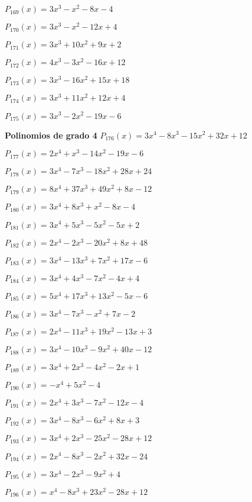 \subitem $P_{169}(x) = 3x^3 - x^2 - 8x - 4$

\subitem $P_{170}(x) = 3x^3 - x^2 - 12x + 4$

\subitem $P_{171}(x) = 3x^3 + 10x^2 + 9x + 2$

\subitem $P_{172}(x) = 4x^3 - 3x^2 - 16x + 12$

\subitem $P_{173}(x) = 3x^3 - 16x^2 + 15x + 18$

\subitem $P_{174}(x) = 3x^3 + 11x^2 + 12x + 4$

\subitem $P_{175}(x) = 3x^3 - 2x^2 - 19x - 6$

\textbf{Polinomios de grado 4} 
\subitem $P_{176}(x) = 3x^4 - 8x^3 - 15x^2 + 32x + 12$

\subitem $P_{177}(x) = 2x^4 + x^3 - 14x^2 - 19x - 6$

\subitem $P_{178}(x) = 3x^4 - 7x^3 - 18x^2 + 28x + 24$

\subitem $P_{179}(x) = 8x^4 + 37x^3 + 49x^2 + 8x - 12$

\subitem $P_{180}(x) = 3x^4 + 8x^3 + x^2 - 8x - 4$

\subitem $P_{181}(x) = 3x^4 + 5x^3 - 5x^2 - 5x + 2$

\subitem $P_{182}(x) = 2x^4 - 2x^3 - 20x^2 + 8x + 48$

\subitem $P_{183}(x) = 3x^4 - 13x^3 + 7x^2 + 17x - 6$

\subitem $P_{184}(x) = 3x^4 + 4x^3 - 7x^2 - 4x + 4$

\subitem $P_{185}(x) = 5x^4 + 17x^3 + 13x^2 - 5x - 6$

\subitem $P_{186}(x) = 3x^4 - 7x^3 - x^2 + 7x - 2$

\subitem $P_{187}(x) = 2x^4 - 11x^3 + 19x^2 - 13x + 3$

\subitem $P_{188}(x) = 3x^4 - 10x^3 - 9x^2 + 40x - 12$

\subitem $P_{189}(x) = 3x^4 + 2x^3 - 4x^2 - 2x + 1$

\subitem $P_{190}(x) = -x^4 + 5x^2 - 4$

\subitem $P_{191}(x) = 2x^4 + 3x^3 - 7x^2 - 12x - 4$

\subitem $P_{192}(x) = 3x^4 - 8x^3 - 6x^2 + 8x + 3$

\subitem $P_{193}(x) = 3x^4 + 2x^3 - 25x^2 - 28x + 12$

\subitem $P_{194}(x) = 2x^4 - 8x^3 - 2x^2 + 32x - 24$

\subitem $P_{195}(x) = 3x^4 - 2x^3 - 9x^2 + 4$

\subitem $P_{196}(x) = x^4 - 8x^3 + 23x^2 - 28x + 12$


